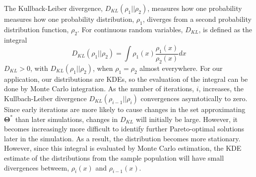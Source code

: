 The Kullback-Leiber divergence\cite{kullback1951_kld}, $D_{KL}(\rho_1\vert\vert\rho_2)$, measures how one probability measures how one probability distribution, $\rho_1$, diverges from a second probability distribution function, $\rho_2$.
For continuous random variables, $D_{KL}$, is defined as the integral
\begin{equation}
   D_{KL}(\rho_1\vert\vert\rho_2)=\int \rho_1(x) \frac{\rho_1(x)}{\rho_2(x)}dx
\end{equation}
$D_{KL} > 0$, with $D_{KL}(\rho_1\vert\vert\rho_2)$, when $\rho_1=\rho_2$ almost everywhere.
For our application, our distributions are KDEs, so the evaluation of the integral can be done by Monte Carlo integration.
As the number of iterations, $i$, increases, the Kullbach-Leiber divergence $D_{KL}(\rho_{i-1}\vert\vert\rho_i)$ convergences asymtotically to zero.
Since early iterations are more likely to cause changes in the set approximating $\bm{\Theta}^*$ than later simulations, changes in $D_{KL}$ will initially be large.
However, it becomes increasingly more difficult to identify further Pareto-optimal solutions later in the simulation.
As a result, the distribution becomes more stationary.
However, since this integral is evaluated by Monte Carlo estimation, the KDE estimate of the distributions from the sample population will have small divergences betweem, $\rho_i(x)$ and $\rho_{i-1}(x)$.
